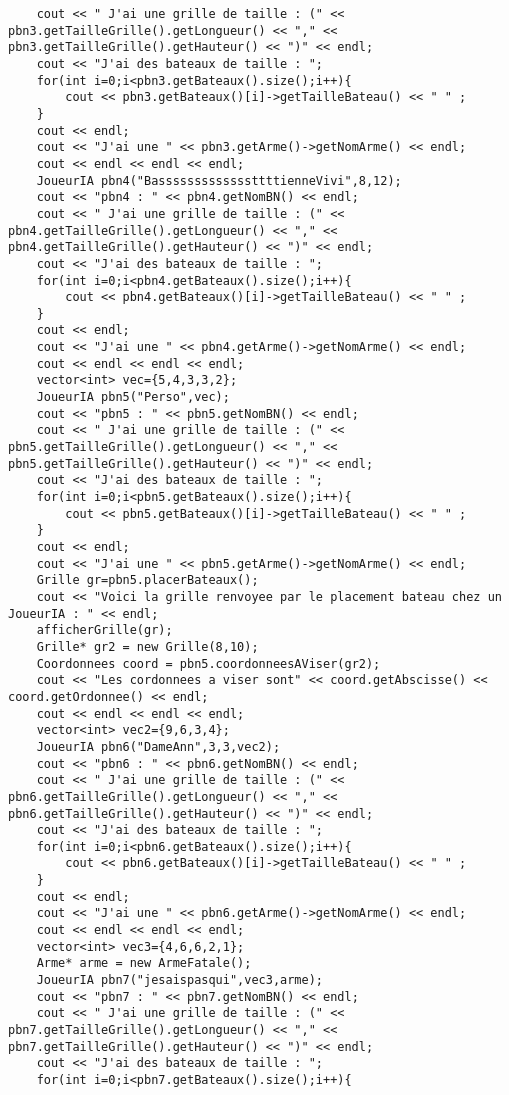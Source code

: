 \begin{lstlisting}
	cout << " J'ai une grille de taille : (" << pbn3.getTailleGrille().getLongueur() << "," << pbn3.getTailleGrille().getHauteur() << ")" << endl;
	cout << "J'ai des bateaux de taille : ";
	for(int i=0;i<pbn3.getBateaux().size();i++){
		cout << pbn3.getBateaux()[i]->getTailleBateau() << " " ;
	}
	cout << endl;
	cout << "J'ai une " << pbn3.getArme()->getNomArme() << endl;
	cout << endl << endl << endl;
	JoueurIA pbn4("BasssssssssssssttttienneVivi",8,12);
	cout << "pbn4 : " << pbn4.getNomBN() << endl;
	cout << " J'ai une grille de taille : (" << pbn4.getTailleGrille().getLongueur() << "," << pbn4.getTailleGrille().getHauteur() << ")" << endl;
	cout << "J'ai des bateaux de taille : ";
	for(int i=0;i<pbn4.getBateaux().size();i++){
		cout << pbn4.getBateaux()[i]->getTailleBateau() << " " ;
	}
	cout << endl;
	cout << "J'ai une " << pbn4.getArme()->getNomArme() << endl;
	cout << endl << endl << endl;
	vector<int> vec={5,4,3,3,2};
	JoueurIA pbn5("Perso",vec);
	cout << "pbn5 : " << pbn5.getNomBN() << endl;
	cout << " J'ai une grille de taille : (" << pbn5.getTailleGrille().getLongueur() << "," << pbn5.getTailleGrille().getHauteur() << ")" << endl;
	cout << "J'ai des bateaux de taille : ";
	for(int i=0;i<pbn5.getBateaux().size();i++){
		cout << pbn5.getBateaux()[i]->getTailleBateau() << " " ;
	}
	cout << endl;
	cout << "J'ai une " << pbn5.getArme()->getNomArme() << endl;
	Grille gr=pbn5.placerBateaux();
	cout << "Voici la grille renvoyee par le placement bateau chez un JoueurIA : " << endl;
	afficherGrille(gr);
	Grille* gr2 = new Grille(8,10);
	Coordonnees coord = pbn5.coordonneesAViser(gr2);
	cout << "Les cordonnees a viser sont" << coord.getAbscisse() << coord.getOrdonnee() << endl;
	cout << endl << endl << endl;
	vector<int> vec2={9,6,3,4};
	JoueurIA pbn6("DameAnn",3,3,vec2);
	cout << "pbn6 : " << pbn6.getNomBN() << endl;
	cout << " J'ai une grille de taille : (" << pbn6.getTailleGrille().getLongueur() << "," << pbn6.getTailleGrille().getHauteur() << ")" << endl;
	cout << "J'ai des bateaux de taille : ";
	for(int i=0;i<pbn6.getBateaux().size();i++){
		cout << pbn6.getBateaux()[i]->getTailleBateau() << " " ;
	}
	cout << endl;
	cout << "J'ai une " << pbn6.getArme()->getNomArme() << endl;
	cout << endl << endl << endl;
	vector<int> vec3={4,6,6,2,1};
	Arme* arme = new ArmeFatale();
	JoueurIA pbn7("jesaispasqui",vec3,arme);
	cout << "pbn7 : " << pbn7.getNomBN() << endl;
	cout << " J'ai une grille de taille : (" << pbn7.getTailleGrille().getLongueur() << "," << pbn7.getTailleGrille().getHauteur() << ")" << endl;
	cout << "J'ai des bateaux de taille : ";
	for(int i=0;i<pbn7.getBateaux().size();i++){

\end{lstlisting}
